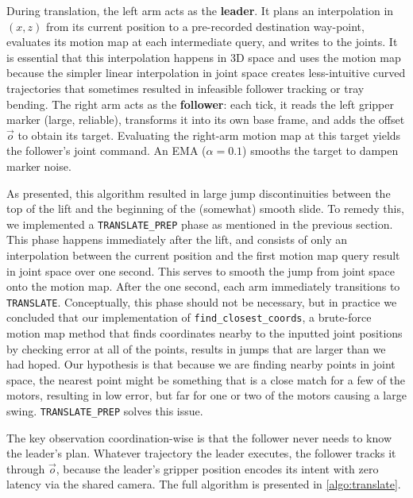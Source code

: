 During translation, the left arm acts as the \textbf{leader}. It plans an interpolation in $(x,z)$ from its current
position to a pre-recorded destination way-point, evaluates its motion map at each intermediate query, and writes to the joints. It is essential that this interpolation happens in 3D space and uses the motion map because the simpler linear interpolation in joint space creates less-intuitive curved trajectories that sometimes resulted in infeasible follower tracking or tray bending. The right arm acts as the \textbf{follower}: each tick, it reads the left gripper marker (large, reliable), transforms it into its own base frame, and adds the offset $\vec{o}$ to obtain its target. Evaluating the right-arm motion map at this target yields the follower's joint command. An EMA ($\alpha=0.1$) smooths the
target to dampen marker noise.

As presented, this algorithm resulted in large jump discontinuities between the top of the lift and the beginning of the (somewhat) smooth slide. To remedy this, we implemented
a \texttt{TRANSLATE\_PREP} phase as mentioned in the previous section. This phase happens immediately after the lift, and consists of only an interpolation between the current position and the first motion map query result in joint space over one second. This serves to smooth the jump from joint space
onto the motion map. After the one second, each arm immediately transitions to \texttt{TRANSLATE}.
Conceptually, this phase should not be necessary, but in practice we concluded that our implementation of
\texttt{find\_closest\_coords}, a brute-force motion map method that finds coordinates nearby to the inputted joint positions by checking error at all of the points, results in jumps that are larger than we had hoped. Our hypothesis is that because we are finding nearby points in joint space, the nearest point might be something that is a close match for a few of the motors, resulting in low error, but far for one or two of the motors causing a large swing. \texttt{TRANSLATE\_PREP} solves this issue.

The key observation coordination-wise is that the follower never needs to know the leader's plan. Whatever trajectory the leader executes, the follower tracks it through
$\vec{o}$, because the leader's gripper position encodes its
intent with zero latency via the shared camera. The full algorithm is presented in \cref{algo:translate}.

